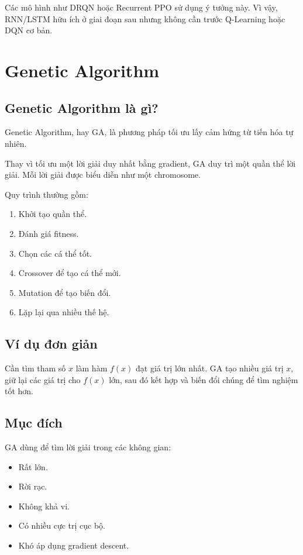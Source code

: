 \documentclass[12pt,a4paper]{report}
\begin{document}
Các mô hình như DRQN hoặc Recurrent PPO sử dụng ý tưởng này. Vì vậy, RNN/LSTM hữu ích ở giai đoạn sau nhưng không cần trước Q-Learning hoặc DQN cơ bản.

\section{Genetic Algorithm}

\subsection{Genetic Algorithm là gì?}

Genetic Algorithm, hay GA, là phương pháp tối ưu lấy cảm hứng từ tiến hóa tự nhiên.

Thay vì tối ưu một lời giải duy nhất bằng gradient, GA duy trì một quần thể lời giải. Mỗi lời giải được biểu diễn như một chromosome.

Quy trình thường gồm:

\begin{enumerate}[leftmargin=1.8em]
    \item Khởi tạo quần thể.
    \item Đánh giá fitness.
    \item Chọn các cá thể tốt.
    \item Crossover để tạo cá thể mới.
    \item Mutation để tạo biến đổi.
    \item Lặp lại qua nhiều thế hệ.
\end{enumerate}

\subsection{Ví dụ đơn giản}

Cần tìm tham số \(x\) làm hàm \(f(x)\) đạt giá trị lớn nhất. GA tạo nhiều giá trị \(x\), giữ lại các giá trị cho \(f(x)\) lớn, sau đó kết hợp và biến đổi chúng để tìm nghiệm tốt hơn.

\subsection{Mục đích}

GA dùng để tìm lời giải trong các không gian:

\begin{itemize}[leftmargin=1.5em]
    \item Rất lớn.
    \item Rời rạc.
    \item Không khả vi.
    \item Có nhiều cực trị cục bộ.
    \item Khó áp dụng gradient descent.
\end{itemize}
\end{document}
